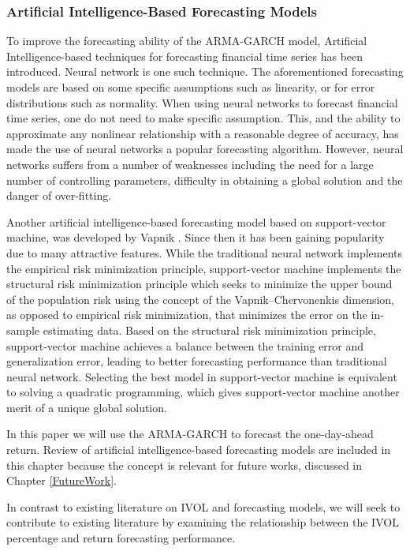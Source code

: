 \subsubsection{Artificial Intelligence-Based Forecasting Models}

To improve the forecasting ability of the ARMA-GARCH model, Artificial Intelligence-based techniques for forecasting financial time series has been introduced. Neural network is one such technique. The aforementioned forecasting models are based on some specific assumptions such as linearity, or for error distributions such as normality. When using neural networks to forecast financial time series, one do not need to make specific assumption. This, and the ability to approximate any nonlinear relationship with a reasonable degree of accuracy, has made the use of neural networks a popular forecasting algorithm. However, neural networks suffers from a number of weaknesses including the need for a large number of controlling parameters, difficulty in obtaining a global solution and the danger of over-fitting.

Another artificial intelligence-based forecasting model based on support-vector machine, was developed by Vapnik \cite{Vapnik1}\cite{Vapnik2}. Since then it has been gaining popularity due to many attractive features. While the traditional neural network implements the empirical risk minimization principle, support-vector machine implements the structural risk minimization principle which seeks to minimize the upper bound of the population risk using the concept of the Vapnik–Chervonenkis dimension, as opposed to empirical risk minimization, that minimizes the error on the in-sample estimating data. Based on the structural risk minimization principle, support-vector machine achieves a balance between the training error and generalization error, leading to better forecasting performance than traditional neural network. Selecting the best model in support-vector machine is equivalent to solving a quadratic programming, which gives support-vector machine another merit of a unique global solution. 

In this paper we will use the ARMA-GARCH to forecast the one-day-ahead return. Review of artificial intelligence-based forecasting models are included in this chapter because the concept is relevant for future works, discussed in Chapter \ref{FutureWork}.

In contrast to existing literature on IVOL and forecasting models, we will seek to contribute to existing literature by examining the relationship between the IVOL percentage and return forecasting performance. 
